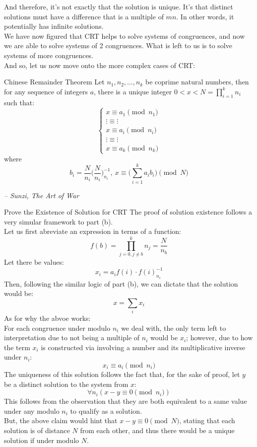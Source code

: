 And therefore, it's not exactly that the solution is unique. It's that distinct solutions must have a difference that is a multiple of $mn$. In other words, it potentially has infinite solutions. \\
We have now figured that CRT helps to solve systems of congruences, and now we are able to solve systems of 2 congruences. What is left to us is to solve systems of more congruences. \\
And so, let us now move onto the more complex cases of CRT:
\begin{ln-theorem}{Chinese Remainder Theorem}{}
    Let $n_1, n_2, \dots, n_k$ be coprime natural numbers, then for any sequence of integers $a$, there is a unique integer $0 < x < N = \prod_{i = 1}^k n_i$ such that:
    \[
        \begin{cases}
            x \equiv a_{1}\pmod{n_1} \\
            \vdots \equiv \vdots \\
            x \equiv a_{i}\pmod{n_i} \\
            \vdots \equiv \vdots \\
            x \equiv a_{k}\pmod{n_k}
        \end{cases}
    \]
    where
    \[b_i = \frac{N}{n_i} \bigg(\frac{N}{n_i} \bigg)_{n_i}^{-1},\ x \equiv \bigg(\sum_{i = 1}^k a_i b_i \bigg)\pmod{N}\]
    \begin{flushright}
        \textit{-- Sunzi, The Art of War}
    \end{flushright}
\end{ln-theorem}
\begin{ln-think}{Prove the Existence of Solution for CRT}{}
    The proof of solution existence follows a very simular framework to part (b). \\
    Let us first abreviate an expression in terms of a function:
    \[f(b) = \prod_{j = 0, j \neq b}^k n_j = \frac{N}{n_b}\]
    Let there be values:
    \[x_i = a_i f(i) \cdot {f(i)}_{n_i}^{-1}\]
    Then, following the similar logic of part (b), we can dictate that the solution would be:
    \[x = \sum_i x_i\]
    As for why the abvoe works: \\
    For each congruence under modulo $n_i$ we deal with, the only term left to interpretation due to not being a multiple of $n_i$ would be $x_i$; however, due to how the term $x_i$ is constructed via involving a number and its multiplicative inverse under $n_i$:
    \[x_i \equiv a_i \pmod{n_i}\]
    The uniqueness of this solution follows the fact that, for the sake of proof, let $y$ be a distinct solution to the system from $x$:
    \[\forall n_i (x - y \equiv 0 \pmod{n_i})\]
    This follows from the observation that they are both equivalent to a same value under any modulo $n_i$ to qualify as a solution. \\
    But, the above claim would hint that $x - y \equiv 0 \pmod{N}$, stating that each solution is of distance $N$ from each other, and thus there would be a unique solution if under modulo $N$.
\end{ln-think}
